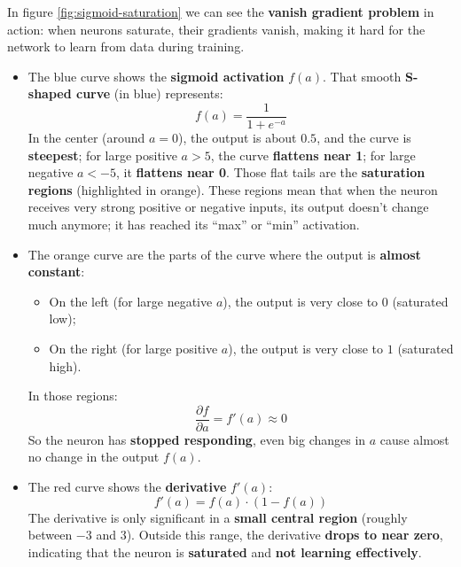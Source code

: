 \noindent
In figure \ref{fig:sigmoid-saturation} we can see the \textbf{vanish gradient problem} in action: when neurons saturate, their gradients vanish, making it hard for the network to learn from data during training.
\begin{itemize}
    \item The blue curve shows the \textbf{sigmoid activation} $f(a)$. That smooth \textbf{S-shaped curve} (in blue) represents:
    \begin{equation*}
        f(a) = \dfrac{1}{1 + e^{-a}}
    \end{equation*}
    In the center (around $a=0$), the output is about $0.5$, and the curve is \textbf{steepest}; for large positive $a>5$, the curve \textbf{flattens near 1}; for large negative $a<-5$, it \textbf{flattens near 0}. Those flat tails are the \textbf{saturation regions} (highlighted in orange). These regions mean that when the neuron receives very strong positive or negative inputs, its output doesn't change much anymore; it has reached its ``max'' or ``min'' activation.
    \item The orange curve are the parts of the curve where the output is \textbf{almost constant}:
    \begin{itemize}
        \item On the left (for large negative $a$), the output is very close to $0$ (saturated low);
        \item On the right (for large positive $a$), the output is very close to $1$ (saturated high).
    \end{itemize}
    In those regions:
    \begin{equation*}
        \dfrac{\partial f}{\partial a} = f'(a) \approx 0
    \end{equation*}
    So the neuron has \textbf{stopped responding}, even big changes in $a$ cause almost no change in the output $f(a)$.
    \item The red curve shows the \textbf{derivative} $f'(a)$:
    \begin{equation*}
        f'(a) = f(a) \cdot (1 - f(a))
    \end{equation*}
    The derivative is only significant in a \textbf{small central region} (roughly between $-3$ and $3$). Outside this range, the derivative \textbf{drops to near zero}, indicating that the neuron is \textbf{saturated} and \textbf{not learning effectively}.
\end{itemize}

